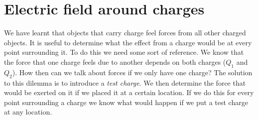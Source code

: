 \section{Electric field around charges}


We have learnt that objects that carry charge feel forces from all
other charged objects. It is useful to determine what the effect
from a charge would be at every point surrounding it. To do this we
need some sort of reference. We know that the force that one
charge feels due to another depends on both charges ($Q_1$ and
$Q_2$). How then can we talk about forces if we only have one
charge? The solution to this dilemma is to introduce a \emph{test
charge}. We then determine the force that would be exerted on it
if we placed it at a certain location. If we do this for every
point surrounding a charge we know what would happen if we put a
test charge at any location.\\
 
